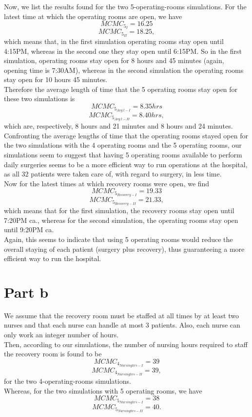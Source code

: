 Now, we list the results found for the two 5-operating-rooms simulations. For the latest time at which the operating rooms are open, we have
$$
MCMC_{5_{I}} = 16.25
$$
$$
MCMC_{5_{II}} = 18.25,
$$
which means that, in the first simulation operating rooms stay open until 4:15PM, whereas in the second one they stay open until 6:15PM. So in the first simulation, operating rooms stay open for 8 hours and 45 minutes (again, opening time is 7:30AM), whereas in the second simulation the operating rooms stay open for 10 hours 45 minutes.\\
Therefore the average length of time that the 5 operating rooms stay open for these two simulations is
$$
MCMC_{5_{Avg.t - I}} = 8.35hrs
$$
$$
MCMC_{5_{Avg.t - II}} = 8.40hrs,
$$
which are, respectively, 8 hours and 21 minutes and 8 hours and 24 minutes.\\
Confronting the average lengths of time that the operating rooms stayed open for the two simulations with the 4 operating rooms and the 5 operating rooms, our simulations seem to suggest that having 5 operating rooms available to perform daily surgeries seems to be a more efficient way to run operations at the hospital, as all 32 patients were taken care of, with regard to surgery, in less time.\\
Now for the latest times at which recovery rooms were open, we find
$$
MCMC_{5_{Recovery-I}} = 19.33
$$
$$
MCMC_{5_{Recovery-II}} = 21.33,
$$
which means that for the first simulation, the recovery rooms stay open until 7:20PM ca., whereas for the second simulation, the operating rooms stay open until 9:20PM ca.\\
Again, this seems to indicate that using 5 operating rooms would reduce the overall staying of each patient (surgery plus recovery), thus guaranteeing a more efficient way to run the hospital.

\section{Part b}
We assume that the recovery room must be staffed at all times by at least two nurses and that each nurse can handle at most 3 patients. Also, each nurse can only work an integer number of hours.\\
Then, according to our simulations, the number of nursing hours required to staff the recovery room is found to be
$$
MCMC_{4_{Nursing hrs-I}} = 39
$$
$$
MCMC_{4_{Nursing hrs-II}} = 39,
$$
for the two 4-operating-rooms simulations.\\
Whereas, for the two simulations with 5 operating rooms, we have
 $$
MCMC_{5_{Nursing hrs-I}} = 38
$$
$$
MCMC_{5_{Nursing hrs-II}} = 40.
$$

